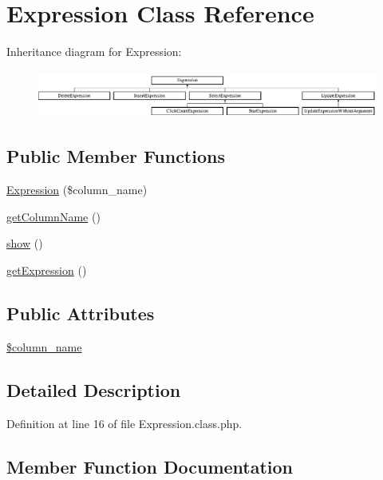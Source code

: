 \hypertarget{classExpression}{}\section{Expression Class Reference}
\label{classExpression}
Inheritance diagram for Expression\+:\begin{figure}[H]
\begin{center}
\leavevmode
\includegraphics[height=1.555556cm]{classExpression}
\end{center}
\end{figure}
\subsection*{Public Member Functions}
\begin{DoxyCompactItemize}
\item 
\hyperlink{classExpression_a059a95604c7c5251b6afc25203d4c417}{Expression} (\$column\+\_\+name)
\item 
\hyperlink{classExpression_a1822fc4ae1532c280ed017265aff00d7}{get\+Column\+Name} ()
\item 
\hyperlink{classExpression_abe2ca73915eb11fbfbc67d14b610bace}{show} ()
\item 
\hyperlink{classExpression_aac1c43a04af3c8208e48e4a67283ff81}{get\+Expression} ()
\end{DoxyCompactItemize}
\subsection*{Public Attributes}
\begin{DoxyCompactItemize}
\item 
\hyperlink{classExpression_aa097fe1e0f08ca2a83341acc172811dd}{\$column\+\_\+name}
\end{DoxyCompactItemize}


\subsection{Detailed Description}


Definition at line 16 of file Expression.\+class.\+php.



\subsection{Member Function Documentation}
\hypertarget{classExpression_a059a95604c7c5251b6afc25203d4c417}{}\label{classExpression_a059a95604c7c5251b6afc25203d4c417} 
